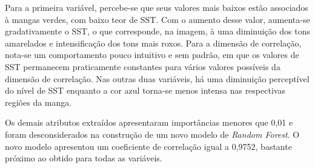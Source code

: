 \begin{figure}[H]
	\label{fig:var_atts}
\end{figure}

Para a primeira variável, percebe-se que seus valores mais baixos estão associados à mangas verdes, com baixo teor de SST. Com o aumento desse valor, aumenta-se gradativamente o SST, o que corresponde, na imagem, à uma diminuição dos tons amarelados e intensificação dos tons mais roxos. Para a dimensão de correlação, nota-se um comportamento pouco intuitivo e sem padrão, em que os valores de SST permanecem praticamente constantes para vários valores possíveis da dimensão de correlação. Nas outras duas variáveis, há uma diminuição perceptível do nível de SST enquanto a cor azul torna-se menos intensa nas respectivas regiões da manga.

Os demais atributos extraídos apresentaram importâncias menores que 0,01 e foram desconsiderados na construção de um novo modelo de \textit{Random Forest}. O novo modelo apresentou um coeficiente de correlação igual a 0,9752, bastante próximo ao obtido para todas as variáveis.

 


